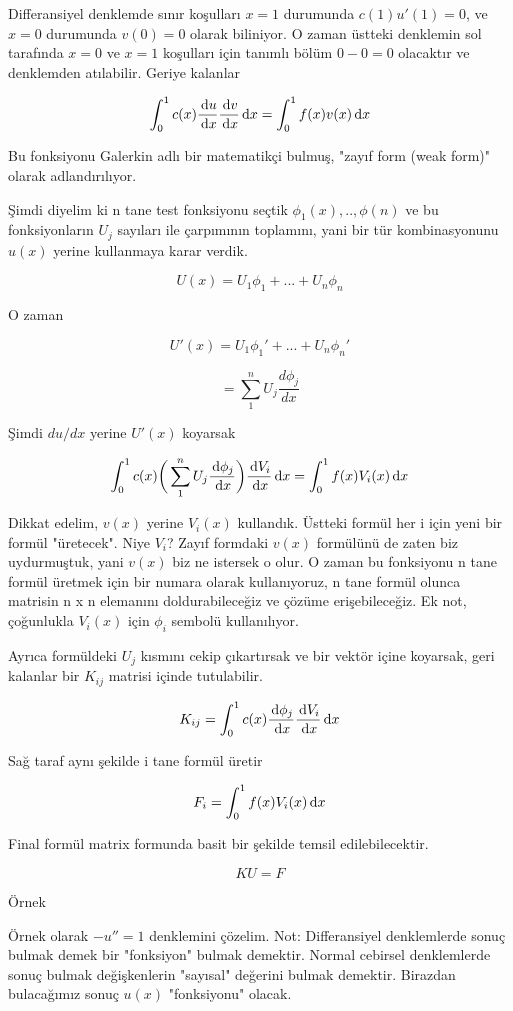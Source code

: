 \documentclass[12pt,fleqn]{article}\usepackage{../../common}
\begin{document}
Differansiyel denklemde sınır koşulları $x=1$ durumunda $c(1)u'(1)=0$,
ve $x=0$ durumunda $v(0)=0$ olarak biliniyor. O zaman üstteki
denklemin sol tarafında $x=0$ ve $x=1$ koşulları için tanımlı bölüm $0
- 0 = 0$ olacaktır ve denklemden atılabilir. Geriye kalanlar

$$
\int_0^1 c(x) \frac{\,\mathrm{d} u}{\,\mathrm{d} x} \frac{\,\mathrm{d} v}{\,\mathrm{d} x} \,\mathrm{d} x
= \int_0^1 f(x)v(x) \,\mathrm{d} x
$$

Bu fonksiyonu Galerkin adlı bir matematikçi bulmuş, "zayıf form (weak
form)" olarak adlandırılıyor.

Şimdi diyelim ki n tane test fonksiyonu seçtik $\phi_1(x),..,\phi(n)$
ve bu fonksiyonların $U_j$ sayıları ile çarpımının toplamını, yani bir
tür kombinasyonunu $u(x)$ yerine kullanmaya karar verdik.

$$ U(x) = U_1 \phi_1+ ... + U_n\phi_n $$

O zaman

$$ U'(x) = U_1 \phi_1'+ ... + U_n\phi_n' $$

$$ = \sum_1^n U_j \frac{d\phi_j}{dx} $$

Şimdi $du / dx$ yerine $U'(x)$ koyarsak

$$
\int_0^1 c(x) \bigg( \sum_1^n U_j \frac{\,\mathrm{d}\phi_j}{\,\mathrm{d} x}\bigg)
\frac{\,\mathrm{d} V_i}{\,\mathrm{d} x}\,\mathrm{d} x
= \int_0^1 f(x)V_i(x)\,\mathrm{d} x
$$

Dikkat edelim, $v(x)$ yerine $V_i(x)$ kullandık. Üstteki formül her i için yeni
bir formül "üretecek". Niye $V_i$? Zayıf formdaki $v(x)$ formülünü de zaten biz
uydurmuştuk, yani $v(x)$ biz ne istersek o olur. O zaman bu fonksiyonu n tane
formül üretmek için bir numara olarak kullanıyoruz, n tane formül olunca
matrisin n x n elemanını doldurabileceğiz ve çözüme erişebileceğiz. Ek not,
çoğunlukla $V_i(x)$ için $\phi_i$ sembolü kullanılıyor.

Ayrıca formüldeki $U_j$ kısmını cekip çıkartırsak ve bir vektör içine koyarsak,
geri kalanlar bir $K_{ij}$ matrisi içinde tutulabilir. 

$$ K_{ij} = \int_0^1 c(x) \frac{\,\mathrm{d}\phi_j}{\,\mathrm{d} x} \frac{\,\mathrm{d} V_i}{\,\mathrm{d} x} \,\mathrm{d} x  $$

Sağ taraf aynı şekilde i tane formül üretir

$$ F_i = \int_0^1 f(x)V_i(x) \,\mathrm{d} x $$

Final formül matrix formunda basit bir şekilde temsil edilebilecektir. 

$$ KU = F $$

Örnek

Örnek olarak $-u'' = 1$ denklemini çözelim. Not: Differansiyel
denklemlerde sonuç bulmak demek bir "fonksiyon" bulmak
demektir. Normal cebirsel denklemlerde sonuç bulmak değişkenlerin
"sayısal" değerini bulmak demektir. Birazdan bulacağımız sonuç
$u(x)$ "fonksiyonu" olacak.
\end{document}
